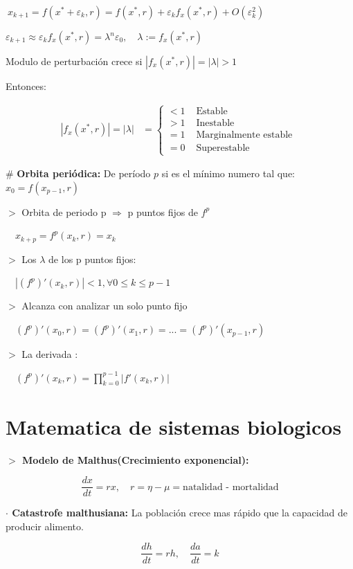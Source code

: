 \documentclass[%
 reprint,
 amsmath,amssymb,
 aps,
]{revtex4-1}
\begin{document}
$\ x_{k+1} = f\left(x^{*}+\varepsilon_{k}, r \right) 
= f\left(x^{*}, r\right)
+ \varepsilon_{k} f_{x}\left(x^{*}, r\right)
+ O\left(\varepsilon^{2}_{k}\right)$

$\varepsilon_{k+1} \approx \varepsilon_{k} f_{x}\left(x^{*}, r\right)
= \lambda^n \varepsilon_0, \quad \lambda := f_{x}\left(x^{*},r\right)$

Modulo de perturbación crece si $|f_{x}\left(x^{*},r\right)| = |\lambda| > 1$

Entonces:

$$
\begin{aligned}
|f_{x}\left(x^{*},r\right)| = |\lambda| &=\left\{\begin{array}{ll}
<1 & \text { Estable } \\
>1 & \text { Inestable } \\
=1 & \text { Marginalmente estable } \\
=0 & \text { Superestable }
\end{array}\right.
\end{aligned}
$$

\# \textbf{Orbita periódica:} De período $p$ si es el mínimo numero tal que: $
x_0 = f(x_{p-1},r)
$

$>$ Orbita de periodo p $\Rightarrow$ p puntos fijos de $f^p$ 

$\quad x_{k+p} = f^p(x_{k},r) = x_{k}$ 

$>$ Los $\lambda$ de los p puntos fijos:

$\quad | (f^p)'(x_k, r) | < 1, \forall 0 \leq k \leq p-1$

$>$ Alcanza con analizar un solo punto fijo

$\quad (f^p)'(x_0, r) =
(f^p)'(x_1, r) =
... =
(f^p)'(x_{p-1}, r)$

$>$ La derivada :

$\quad (f^p)'(x_k, r) = 
\prod_{k=0}^{p-1} 
|f ' (x_k, r)|
$

\section{Matematica de sistemas biologicos}

\textbf{$>$ Modelo de Malthus(Crecimiento exponencial):}

$$\frac{d x}{d t}=r x, \quad 
r=\eta-\mu = \text{natalidad - mortalidad}$$


\textbf{$\cdot$ Catastrofe malthusiana:} La población crece mas rápido que la capacidad de producir alimento.

$$\frac{dh}{dt} = rh, \quad \frac{da}{dt} = k$$
\end{document}
